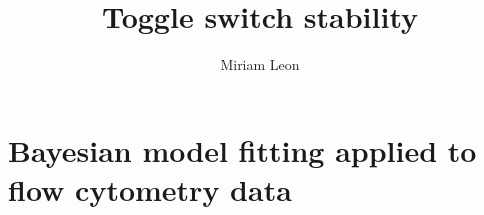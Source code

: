 \documentclass[]{../chapter_only}
\title{Toggle switch stability}
\author{Miriam Leon}
\begin{document}

\tableofcontents*
{}


\mainmatter*
\chapter{Bayesian model fitting applied to flow cytometry data}

%
%




\printbibliography
\end{document}
